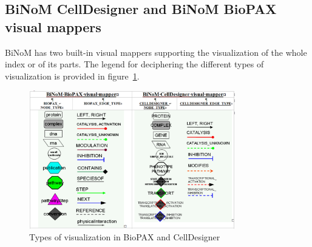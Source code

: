 \subsection{BiNoM CellDesigner and BiNoM BioPAX visual mappers}\label{CellDesigner_BioPAX_visual_mappers}
BiNoM has two built-in visual mappers supporting the visualization of the whole index or of its parts. The legend for deciphering the different types of visualization is provided in figure~\ref{BioPAX_visualizations}.
\begin{figure}
\centering
\includegraphics[width=0.8\textwidth]{graphics/BioPAX_visualizations}
\caption{Types of visualization in BioPAX and CellDesigner}
\label{BioPAX_visualizations}
\end{figure}

